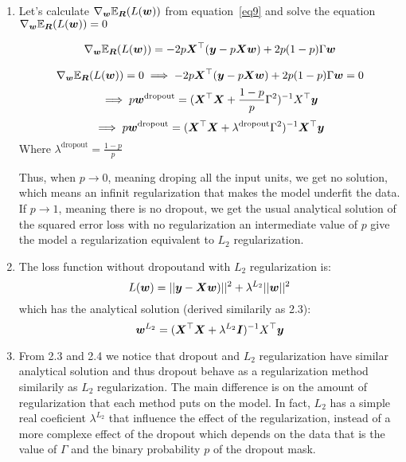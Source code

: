 {\begin{enumerate}
	Now let's put all together, and replace the last equations back to equation~\ref{eq8}:
	\begin{equation} \label{eq9}
	\begin{split}
	\E_{\mR}[L(\vw)] & = ||\vy - p\mX\vw)||^2-p(p-1)\vw^\top\Gamma^2\vw\\
	& = ||\vy - p\mX\vw)||^2+p(1-p)(\vw\Gamma)^\top(\vw\Gamma)\\
	& = ||\vy - p\mX\vw)||^2+p(1-p)||\Gamma\vw\||^2\\
	\end{split}
	\end{equation}
	
	\item Let's calculate $\nabla_{{\bm{w}}}\mathbb{E}_{{\bm{R}}}(L({\bm{w}}))$ from equation~\ref{eq9} and solve the equation $\nabla_{{\bm{w}}}\mathbb{E}_{{\bm{R}}}(L({\bm{w}}))=0$
	
	\begin{equation} \label{eq10}
	\begin{split}
	\nabla_{{\bm{w}}}\mathbb{E}_{{\bm{R}}}(L({\bm{w}})) & = -2p{\bm{X}}^\top({\bm{y}}-p{\bm{X}}{\bm{w}})+2p(1-p)\Gamma{\bm{w}}\\
	\end{split}
	\end{equation}
	
	$$\nabla_{{\bm{w}}}\mathbb{E}_{{\bm{R}}}(L({\bm{w}})) = 0 \implies -2p{\bm{X}}^\top({\bm{y}}-p{\bm{X}}{\bm{w}})+2p(1-p)\Gamma{\bm{w}} = 0$$
	$$\implies p{\bm{w}}^{\mathrm{dropout}} = ({\bm{X}}^\top{\bm{X}}+\frac{1-p}{p}\Gamma^2)^{-1}X^\top{\bm{y}}$$
	$$\implies p{\bm{w}}^{\mathrm{dropout}} =({\bm{X}}^\top{\bm{X}}+\lambda^{\mathrm{dropout}}\Gamma^2)^{-1}{\bm{X}}^\top{\bm{y}}$$
	Where $\lambda^{\mathrm{dropout}} = \frac{1-p}{p}$
	
	Thus, when $p \to 0$, meaning droping all the input units, we get no solution, which means an infinit regularization that makes the model underfit the data.\\
	If $p \to 1$, meaning there is no dropout, we get the usual analytical solution of the squared error loss with no regularization
	an intermediate value of $p$ give the model a regularization equivalent to $L_2$ regularization.
	
	\item The loss function without dropoutand with $L_2$ regularization is:
	$$L({\bm{w}}) = ||{\bm{y}} - {\bm{X}}{\bm{w}})||^2 + \lambda^{L_2}||{\bm{w}}||^2$$
	which has the analytical solution (derived similarily as 2.3):
	$${\bm{w}}^{L_2} = ({\bm{X}}^\top{\bm{X}}+\lambda^{L_2}{\bm{I}})^{-1}X^\top{\bm{y}}$$
	
	\item From 2.3 and 2.4 we notice that dropout and $L_2$ regularization have similar analytical solution and thus dropout behave as a regularization method similarily as $L_2$ regularization. The main difference is on the amount of regularization that each method puts on the model. In fact, $L_2$ has a simple real coeficient $\lambda^{L_2}$ that influence the effect of the regularization, instead of a more complexe effect of the dropout which depends on the data that is the value of $\Gamma$ and the binary probability $p$ of the dropout mask.
	
	
\end{enumerate}
}
